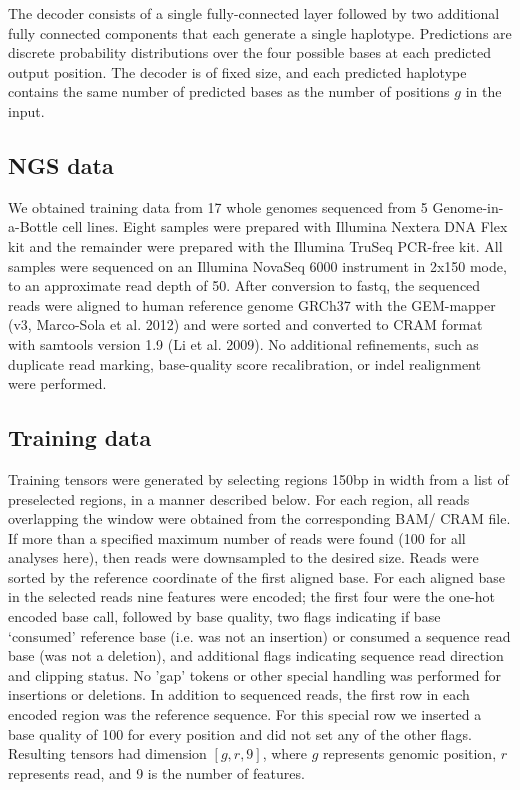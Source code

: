 \documentclass[]{article}
\begin{document}
The decoder consists of a single fully-connected layer followed by two additional fully connected components that each generate a single haplotype. Predictions are discrete probability distributions over the four possible bases at each predicted output position. The decoder is of fixed size, and each predicted haplotype contains the same number of predicted bases as the number of positions $g$ in the input. 


\subsection{NGS data}

We obtained training data from 17 whole genomes sequenced from 5 Genome-in-a-Bottle cell lines. Eight samples were prepared with Illumina Nextera DNA Flex kit and the remainder were prepared with the Illumina TruSeq PCR-free kit. All samples were sequenced on an Illumina NovaSeq 6000 instrument in 2x150 mode, to an approximate read depth of 50. After conversion to fastq, the sequenced reads were aligned to human reference genome GRCh37 with the GEM-mapper (v3, Marco-Sola et al. 2012) and were sorted and converted to CRAM format with samtools version 1.9 (Li et al. 2009). No additional refinements, such as duplicate read marking, base-quality score recalibration, or indel realignment were performed.

\subsection{Training data}

Training tensors were generated by selecting regions 150bp in width from a list of preselected regions, in a manner described below. For each region, all reads overlapping the window were obtained from the corresponding BAM/ CRAM file. If more than a specified maximum number of reads were found (100 for all analyses here), then reads were downsampled to the desired size.  Reads were sorted by the reference coordinate of the first aligned base. For each aligned base in the selected reads nine features were encoded; the first four were the one-hot encoded base call, followed by base quality, two flags indicating if base `consumed' reference base (i.e. was not an insertion) or consumed a sequence read base (was not a deletion), and additional flags indicating sequence read direction and clipping status.  No 'gap' tokens or other special handling was performed for insertions or deletions. In addition to sequenced reads, the first row in each encoded region was the reference sequence. For this special row we inserted a base quality of 100 for every position and did not set any of the other flags. Resulting tensors had dimension $[g, r, 9]$, where $g$ represents genomic position, $r$ represents read, and 9 is the number of features. 
\end{document}
